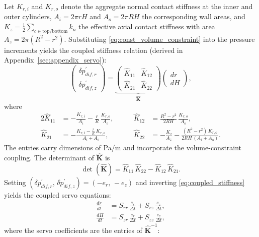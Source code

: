 \documentclass[a4paper,fleqn]{cas-sc}
\begin{document}
Let $K_{r,i}$ and $K_{r,o}$ denote the aggregate normal contact stiffness at the inner and outer cylinders, $A_i=2\pi rH$ and $A_o=2\pi RH$ the corresponding wall areas, and $K_z=\frac{1}{2}\sum_{c\in\mathrm{top/bottom}} k_n$ the effective axial contact stiffness with area $A_z=2\pi(R^2-r^2)$. Substituting \cref{eq:const_volume_constraint} into the pressure increments yields the coupled stiffness relation (derived in Appendix~\ref{sec:appendix_servo}):
\begin{equation}
\begin{pmatrix} \delta p_{dif,r}^{\prime} \\[4pt] \delta p_{dif,z}^{\prime} \end{pmatrix}
=
\underbrace{\begin{pmatrix} \hat{K}_{11} & \hat{K}_{12} \\[6pt] \hat{K}_{21} & \hat{K}_{22} \end{pmatrix}}_{\hat{\mathbf{K}}}
\begin{pmatrix} dr \\[4pt] dH \end{pmatrix},
\label{eq:coupled_stiffness}
\end{equation}
where
\begin{alignat}{2}
\hat{K}_{11} &= -\frac{K_{r,i}}{A_i}-\frac{r}{R}\,\frac{K_{r,o}}{A_o}, &\qquad
\hat{K}_{12} &= \frac{R^2-r^2}{2RH}\,\frac{K_{r,o}}{A_o}, \label{eq:Khat_main_row1}\\[4pt]
\hat{K}_{21} &= -\frac{K_{r,i}-\frac{r}{R}\,K_{r,o}}{A_i+A_o}, &\qquad
\hat{K}_{22} &= -\frac{K_z}{A_z}-\frac{(R^2-r^2)\,K_{r,o}}{2RH\,(A_i+A_o)}. \label{eq:Khat_main_row2}
\end{alignat}
The entries carry dimensions of Pa/m and incorporate the volume-constraint coupling. The determinant of $\hat{\mathbf{K}}$ is
\begin{equation}
\det(\hat{\mathbf{K}}) = \hat{K}_{11}\,\hat{K}_{22} - \hat{K}_{12}\,\hat{K}_{21}.
\label{eq:det_K_main}
\end{equation}
Setting $(\delta p_{dif,r}^{\prime},\,\delta p_{dif,z}^{\prime})=(-e_r,\,-e_z)$ and inverting \cref{eq:coupled_stiffness} yields the coupled servo equations:
\begin{align}
\frac{dr}{dt} &= S_{rr}\,\frac{e_r}{\Delta t} + S_{rz}\,\frac{e_z}{\Delta t}, \label{eq:servo_dr}\\[6pt]
\frac{dH}{dt} &= S_{zr}\,\frac{e_r}{\Delta t} + S_{zz}\,\frac{e_z}{\Delta t}, \label{eq:servo_dH}
\end{align}
where the servo coefficients are the entries of $\hat{\mathbf{K}}^{-1}$:
\end{document}
